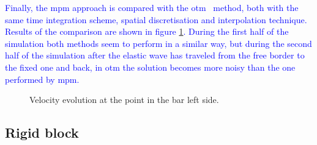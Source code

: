 \documentclass[preprint,12pt,a4paper]{elsarticle}
\begin{document}
\textcolor{blue}{Finally, the \acrshort{mpm} approach is compared with the \acrfull{otm}~\cite{Li2010} method, both with the same time integration scheme, spatial discretisation and interpolation technique. Results of the comparison are shown in figure \ref{fig:Dyka-OTM-MPM}. During the first half of the simulation both methods seem to perform in a similar way, but during the second half of the simulation after the elastic wave has traveled from the free border to
the fixed one and back, in \acrshort{otm} the solution becomes more noisy than the one performed by \acrshort{mpm}.}   
\begin{figure}
  \centering
  \caption{Velocity evolution at the point in the bar left side.}
  \label{fig:Dyka-OTM-MPM}
\end{figure}

\subsection{Rigid block}
\label{sec:andersen-block}
\end{document}
